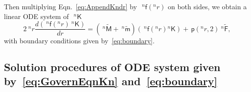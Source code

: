 \documentclass[preprint,10pt,times]{elsarticle}
\numberwithin{equation}{section}
\renewcommand{\u}[1]{\boldsymbol{#1}}
\newcommand{\usf}[1]{\u{\mathsf #1}}
\newcommand{\pr}[1]{\left( #1 \right)}
\newcommand{\p}{\,\mathsf{p}}
\renewcommand{\>}{$\Rightarrow$}
\begin{document}
Then multiplying Eqn.~\eqref{eq:AppendKndr} by~$~^{n}\usf{f}({}^{n}\!r)$ on both sides, we obtain a linear ODE system of~$~^{n}{\usf{K}}$
\begin{equation}
	2 ~^{n}\!{r} \frac{d \pr{~^{n}\usf{f}({}^{n}\!r)~^{n}{\usf{K}}}}{dr} = \pr{~^{n}\tilde{\usf{M}} + ~^{n}\tilde{\usf{m}}} \pr{~^{n}\usf{f}({}^{n}\!r){}^{n}{\usf{K}}} + \p\pr{{}^{n}\!{r},2} ~^{n}\tilde{\usf{F}},
	\label{eq:AppendKn}
\end{equation}
with boundary conditions given by~\eqref{eq:boundary}.


\subsection{Solution procedures of ODE system given by~\eqref{eq:GovernEqnKn} and~\eqref{eq:boundary}}
\label{Appen:SolvingODE}
\end{document}
